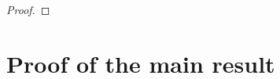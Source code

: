 \documentclass[12pt]{article}
\DeclarePairedDelimiter\floor{\lfloor}{\rfloor}
\newcommand{\Pro}{\mathbb{P}}
\newcommand{\env}{\mathcal{A}}
\newcommand*\Proo[1]{\Pro \left( #1 \right) }
\newcommand{\expect}{\operatorname{\mathbb{E}}\expectarg}
\begin{document}
\begin{proof}

\end{proof}
\section{Proof of the main result}
\end{document}
